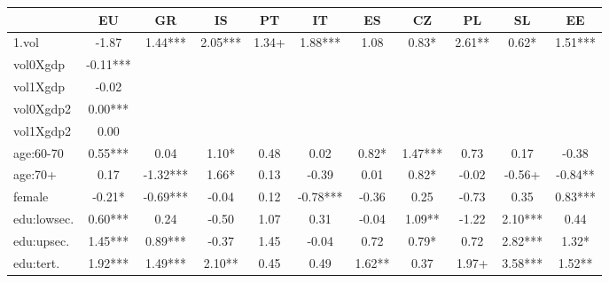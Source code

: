 {
\def\sym#1{\ifmmode^{#1}\else\(^{#1}\)\fi}
\begin{tabular}{l*{10}{c}}
\hline\hline
            &\multicolumn{1}{c}{EU}&\multicolumn{1}{c}{GR}&\multicolumn{1}{c}{IS}&\multicolumn{1}{c}{PT}&\multicolumn{1}{c}{IT}&\multicolumn{1}{c}{ES}&\multicolumn{1}{c}{CZ}&\multicolumn{1}{c}{PL}&\multicolumn{1}{c}{SL}&\multicolumn{1}{c}{EE}\\
\hline
1.vol       &       -1.87   &        1.44***&        2.05***&        1.34+  &        1.88***&        1.08   &        0.83*  &        2.61** &        0.62*  &        1.51***\\
vol0Xgdp    &       -0.11***&               &               &               &               &               &               &               &               &               \\
vol1Xgdp    &       -0.02   &               &               &               &               &               &               &               &               &               \\
vol0Xgdp2   &        0.00***&               &               &               &               &               &               &               &               &               \\
vol1Xgdp2   &        0.00   &               &               &               &               &               &               &               &               &               \\
age:60-70   &        0.55***&        0.04   &        1.10*  &        0.48   &        0.02   &        0.82*  &        1.47***&        0.73   &        0.17   &       -0.38   \\
age:70+     &        0.17   &       -1.32***&        1.66*  &        0.13   &       -0.39   &        0.01   &        0.82*  &       -0.02   &       -0.56+  &       -0.84** \\
female      &       -0.21*  &       -0.69***&       -0.04   &        0.12   &       -0.78***&       -0.36   &        0.25   &       -0.73   &        0.35   &        0.83***\\
edu:lowsec. &        0.60***&        0.24   &       -0.50   &        1.07   &        0.31   &       -0.04   &        1.09** &       -1.22   &        2.10***&        0.44   \\
edu:upsec.  &        1.45***&        0.89***&       -0.37   &        1.45   &       -0.04   &        0.72   &        0.79*  &        0.72   &        2.82***&        1.32*  \\
edu:tert.   &        1.92***&        1.49***&        2.10** &        0.45   &        0.49   &        1.62** &        0.37   &        1.97+  &        3.58***&        1.52** \\

\end{tabular}}
